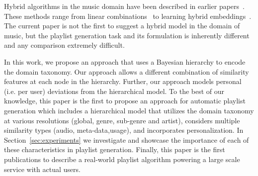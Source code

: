Hybrid algorithms in the music domain have been described in earlier papers~\cite{Knees:2006, Mcfee_learningsimilarity_CF,McFee_multi_similarities,Schedl:2015}. These methods range from linear combinations~\cite{Knees:2006} to learning hybrid embeddings~\cite{McFee_multi_similarities}.
The current paper is not the first to suggest a hybrid model in the domain of music, but the playlist generation task and its formulation is inherently different and any comparison extremely difficult.  



In this work, we propose an approach that uses a Bayesian hierarchy to encode the domain taxonomy.
Our approach allows a different combination of similarity features at each node in the hierarchy. Further, our approach models personal (i.e. per user) deviations from the hierarchical model.
To the best of our knowledge, this paper is the first to propose an approach for automatic  playlist generation which includes a hierarchical model that utilizes the domain taxonomy at various resolutions (global, genre, sub-genre and artist), considers multiple similarity types (audio, meta-data,usage), and incorporates personalization. 
In Section~\ref{sec:experiments} we investigate and showcase the importance of each of these characteristics in playlist generation.
Finally, this paper is the first publications to describe a real-world playlist algorithm powering a large scale service with actual users. 



